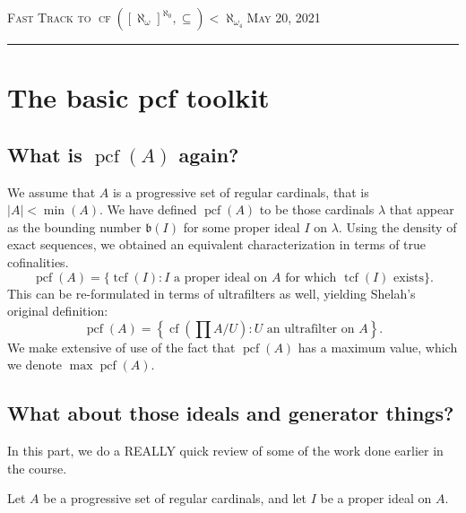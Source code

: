 \documentclass[10pt]{amsart}
\theoremstyle{plain}
\theoremstyle{definition}
\theoremstyle{remark}
\DeclareMathOperator{\tcf}{tcf}
\DeclareMathOperator{\cf}{cf}
\DeclareMathOperator{\pcf}{pcf}
\numberwithin{equation}{section}
\begin{document}
\thispagestyle{empty}

{\scshape } \hfill {\scshape \Large Fast Track to $\cf\left([\aleph_\omega]^{\aleph_0},\subseteq\right)<\aleph_{\omega_4}$\hfill {\scshape May 20, 2021 }}

\medskip

\hrule

\bigskip

\bigskip

\section{The basic pcf toolkit}

\subsection{What is $\pcf(A)$ again?}
We assume that $A$ is a progressive set of regular cardinals, that is $|A|<\min(A)$.  We have defined $\pcf(A)$ to be those cardinals $\lambda$ that appear as the bounding number $\mathfrak{b}(I)$ for some proper ideal $I$ on $\lambda$.  Using the density of exact sequences, we obtained an equivalent characterization in terms of true cofinalities.
\begin{equation}
\pcf(A) = \{\tcf(I): I\text{ a proper ideal on $A$ for which $\tcf(I)$ exists}\}.
\end{equation}
This can be re-formulated in terms of ultrafilters as well, yielding Shelah's original definition:
\begin{equation}
\pcf(A) = \left\{\cf\left(\prod A/ U\right): \text{$U$ an ultrafilter on $A$}\right\}.
\end{equation}
We make extensive of use of the fact that $\pcf(A)$ has a maximum value, which we denote $\max\pcf(A)$.

\subsection{What about those ideals and generator things?}

In this part, we do a REALLY quick review of some of the work done earlier in the course.

Let $A$ be a progressive set of regular cardinals, and let $I$ be a proper ideal on $A$.
\end{document}
